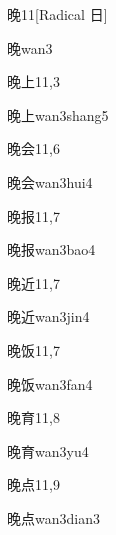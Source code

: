 \begin{entry}{晚}{11}[Radical 日]
  \begin{phonetics}{晚}{wan3}
  \end{phonetics}
\end{entry}

\begin{entry}{晚上}{11,3}
  \begin{phonetics}{晚上}{wan3shang5}
  \end{phonetics}
\end{entry}

\begin{entry}{晚会}{11,6}
  \begin{phonetics}{晚会}{wan3hui4}
  \end{phonetics}
\end{entry}

\begin{entry}{晚报}{11,7}
  \begin{phonetics}{晚报}{wan3bao4}
  \end{phonetics}
\end{entry}

\begin{entry}{晚近}{11,7}
  \begin{phonetics}{晚近}{wan3jin4}
  \end{phonetics}
\end{entry}

\begin{entry}{晚饭}{11,7}
  \begin{phonetics}{晚饭}{wan3fan4}
  \end{phonetics}
\end{entry}

\begin{entry}{晚育}{11,8}
  \begin{phonetics}{晚育}{wan3yu4}
  \end{phonetics}
\end{entry}

\begin{entry}{晚点}{11,9}
  \begin{phonetics}{晚点}{wan3dian3}
  \end{phonetics}
\end{entry}

